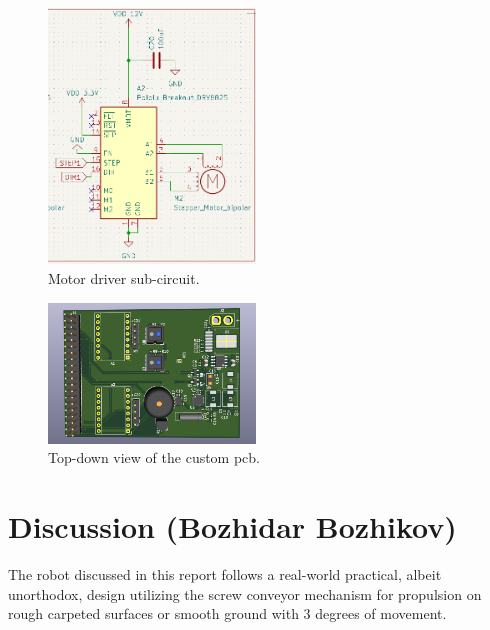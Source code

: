 \documentclass[12pt,a4paper,english]{article}
\begin{document}
\begin{figure}[!ht]
  \begin{center}
    \includegraphics[width=5.5cm]{./Figures/motor.png}
    \caption{Motor driver sub-circuit.}
  \end{center}
\end{figure}

\begin{figure}[!ht]
  \begin{center}
    \includegraphics[width=5.5cm]{./Figures/pcb.png}
    \caption{Top-down view of the custom pcb.}
  \end{center}
\end{figure}

\section{Discussion (Bozhidar Bozhikov)}

The robot discussed in this report follows a real-world practical, albeit unorthodox, design utilizing the screw conveyor mechanism for propulsion on rough carpeted surfaces or smooth ground with 3 degrees of movement.


%
%

%
%
\end{document}
